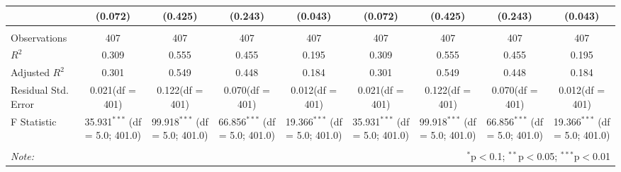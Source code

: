 \begin{table}[!htbp]
\begin{tabular}{@{\extracolsep{5pt}}lcccccccc}
  & (0.072) & (0.425) & (0.243) & (0.043) & (0.072) & (0.425) & (0.243) & (0.043) \\
\hline \\[-1.8ex]
 Observations & 407 & 407 & 407 & 407 & 407 & 407 & 407 & 407 \\
 $R^2$ & 0.309 & 0.555 & 0.455 & 0.195 & 0.309 & 0.555 & 0.455 & 0.195 \\
 Adjusted $R^2$ & 0.301 & 0.549 & 0.448 & 0.184 & 0.301 & 0.549 & 0.448 & 0.184 \\
 Residual Std. Error & 0.021(df = 401) & 0.122(df = 401) & 0.070(df = 401) & 0.012(df = 401) & 0.021(df = 401) & 0.122(df = 401) & 0.070(df = 401) & 0.012(df = 401)  \\
 F Statistic & 35.931$^{***}$ (df = 5.0; 401.0) & 99.918$^{***}$ (df = 5.0; 401.0) & 66.856$^{***}$ (df = 5.0; 401.0) & 19.366$^{***}$ (df = 5.0; 401.0) & 35.931$^{***}$ (df = 5.0; 401.0) & 99.918$^{***}$ (df = 5.0; 401.0) & 66.856$^{***}$ (df = 5.0; 401.0) & 19.366$^{***}$ (df = 5.0; 401.0) \\
\hline
\hline \\[-1.8ex]
\textit{Note:} & \multicolumn{8}{r}{$^{*}$p$<$0.1; $^{**}$p$<$0.05; $^{***}$p$<$0.01} \\
\end{tabular}
\end{table}